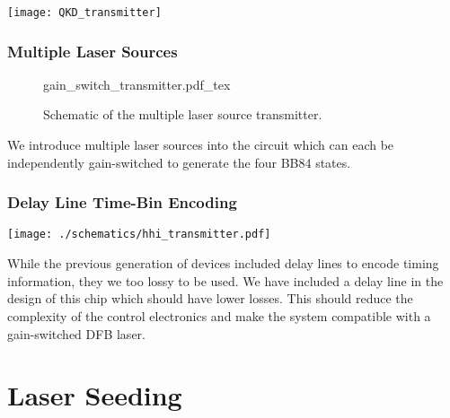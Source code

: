 \begin{sidewaysfigure}
	\centering
	\texttt{[image: QKD\_transmitter]}
	\caption[Latest generation InP QKD Transmitter]{Latest generation HHI indium phosphide transmitter. The \SI[product-units=power]{6x4}{mm} chip contains a few ways to create BB84 states for QKD. Firstly, we have designs to compare \ac{dfb} and \ac{DBR} lasers. Secondly, we can use a delay line to separate the time bins. Finally, we have multiplexed lasers to pulse independently lasers for each state.}
	\label{fig:hhi_gds}
\end{sidewaysfigure}

\subsubsection*{Multiple Laser Sources}

\begin{figure}
	\centering
	\def\svgwidth{\textwidth}
	{gain_switch_transmitter.pdf_tex}
		\caption[Schematic of the multiple laser source transmitter]{Schematic of the multiple laser source transmitter.}
	\label{fig:multiple_lasers_tx}
\end{figure}

We introduce multiple laser sources into the circuit which can each be independently gain-switched to generate the four BB84 states. 

\subsubsection*{Delay Line Time-Bin Encoding}

\begin{sidewaysfigure}
	\centering
	\texttt{[image: ./schematics/hhi\_transmitter.pdf]}
	\caption[Schematic of the HHI full transmitter]{Schematic of the HHI transmitter}
	\label{fig:hhi_transmitter}
\end{sidewaysfigure}

While the previous generation of devices included delay lines to encode timing information, they we too lossy to be used. We have included a delay line in the design of this chip which should have lower losses. This should reduce the complexity of the control electronics and make the system compatible with a gain-switched DFB laser.

\section{Laser Seeding}

